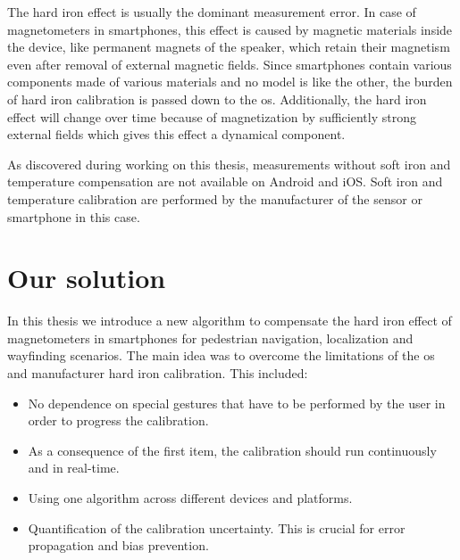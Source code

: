 The hard iron effect is usually the dominant measurement error.\cite{vectornav} In case of magnetometers in smartphones, this effect is caused by magnetic materials inside the device, like permanent magnets of the speaker, which retain their magnetism even after removal of external magnetic fields. Since smartphones contain various components made of various materials and no model is like the other, the burden of hard iron calibration is passed down to the \gls{os}. Additionally, the hard iron effect will change over time because of magnetization by sufficiently strong external fields which gives this effect a dynamical component.

As discovered during working on this thesis, measurements without soft iron and temperature compensation are not available on Android and iOS.\cite{android_sdk_sensorevent}\cite{ios_cmmagneticfield} Soft iron and temperature calibration are performed by the manufacturer of the sensor or smartphone in this case.

\section{Our solution}

In this thesis we introduce a new algorithm to compensate the hard iron effect of magnetometers in smartphones for pedestrian navigation, localization and wayfinding scenarios. The main idea was to overcome the limitations of the \gls{os} and manufacturer hard iron calibration. This included:

\begin{itemize}
  \item No dependence on special gestures that have to be performed by the user in order to progress the calibration.
  \item As a consequence of the first item, the calibration should run continuously and in real-time.
  \item Using one algorithm across different devices and platforms.
  \item Quantification of the calibration uncertainty. This is crucial for error propagation and bias prevention.
\end{itemize}

